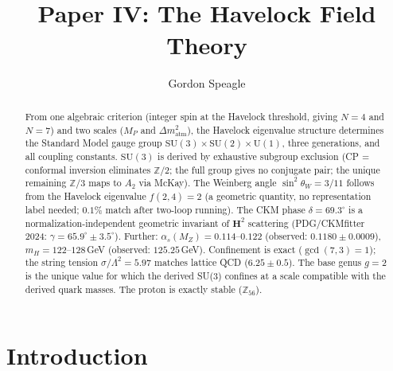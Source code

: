 









\title{\seriestitle\\[6pt]\large Paper IV: The Havelock Field Theory}
\author{Gordon Speagle}
\date{}


\maketitle

\begin{abstract}
From one algebraic criterion (integer spin at the
Havelock threshold, giving $N = 4$ and $N = 7$)
and two scales ($M_P$ and $\Delta m^2_{\mathrm{atm}}$),
the Havelock eigenvalue structure determines the
Standard Model gauge group
$\mathrm{SU}(3) \times \mathrm{SU}(2) \times \mathrm{U}(1)$,
three generations, and all coupling constants.
$\mathrm{SU}(3)$ is derived by exhaustive subgroup exclusion
(CP = conformal inversion eliminates $\mathbb{Z}/2$;
the full group gives no conjugate pair;
the unique remaining $\mathbb{Z}/3$ maps to $A_2$ via McKay).
The Weinberg angle $\sin^2\theta_W = 3/11$ follows from the
Havelock eigenvalue $f(2,4) = 2$ (a geometric quantity,
no representation label needed; $0.1\%$ match after two-loop running).
The CKM phase $\delta = 69.3^\circ$ is a normalization-independent
geometric invariant of $\mathbf{H}^2$ scattering
(PDG/CKMfitter 2024: $\gamma = 65.9^\circ \pm 3.5^\circ$).
Further: $\alpha_s(M_Z) = 0.114$--$0.122$
(observed: $0.1180 \pm 0.0009$),
$m_H = 122$--$128$\,GeV (observed: $125.25$\,GeV).
Confinement is exact ($\gcd(7,3) = 1$);
the string tension $\sigma/\Lambda^2 = 5.97$
matches lattice QCD ($6.25 \pm 0.5$).
The base genus $g = 2$ is the unique value for which
the derived SU(3) confines at a scale compatible with
the derived quark masses.
The proton is exactly stable ($\mathbb{Z}_{56}$).
\end{abstract}

\section{Introduction}
\label{sec:intro}

